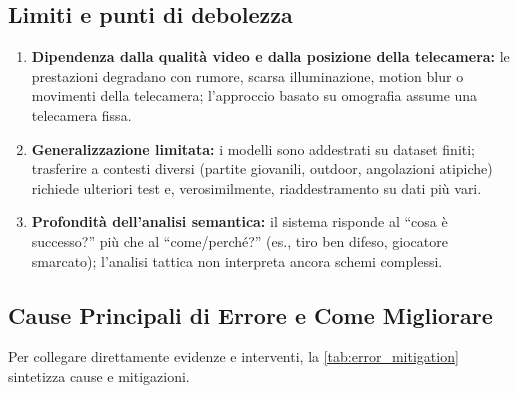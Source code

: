 \documentclass[12pt,a4paper,openright,twoside]{book}
\begin{document}
\subsection{Limiti e punti di debolezza}
\begin{enumerate}
  \item \textbf{Dipendenza dalla qualità video e dalla posizione della telecamera:}
  le prestazioni degradano con rumore, scarsa illuminazione, motion blur
  o movimenti della telecamera; l'approccio basato su omografia 
  assume una telecamera fissa.
  \item \textbf{Generalizzazione limitata:}
  i modelli sono addestrati su dataset finiti; trasferire a contesti 
  diversi (partite giovanili, outdoor, angolazioni atipiche) richiede 
  ulteriori test e, verosimilmente, riaddestramento su dati più vari.
  \item \textbf{Profondità dell'analisi semantica:}
  il sistema risponde al ``cosa è successo?'' più che al ``come/perché?''
  (es., tiro ben difeso, giocatore smarcato); l'analisi tattica non interpreta ancora schemi complessi.
\end{enumerate}

\subsection{Cause Principali di Errore e Come Migliorare}
Per collegare direttamente evidenze e interventi, la 
\autoref{tab:error_mitigation} sintetizza cause e mitigazioni.
\end{document}
